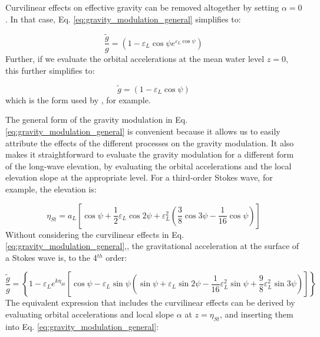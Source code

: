\documentclass[lineno]{jfm}
\begin{document}
Curvilinear effects on effective gravity can be removed altogether by setting
$\alpha = 0$.
In that case, Eq. \ref{eq:gravity_modulation_general} simplifies to:

\begin{equation}
\label{eq:gravity_modulation_linear_no_curvature}
\frac{\widetilde{g}}{g} = \left( 1 - \varepsilon_L \cos{\psi} e^{\varepsilon_L \cos{\psi}} \right)
\end{equation}
Further, if we evaluate the orbital accelerations at the mean water level $z=0$,
this further simplifies to:

\begin{equation}
\label{eq:gravity_modulation_linear_no_curvature_mean_level}
\widetilde{g} = \left( 1 - \varepsilon_L \cos{\psi} \right)
\end{equation}
which is the form used by \citet{peureux2021unsteady}, for example.

The general form of the gravity modulation in Eq. \ref{eq:gravity_modulation_general}
is convenient because it allows us to easily attribute the effects of the different
processes on the gravity modulation.
It also makes it straightforward to evaluate the gravity modulation for a different
form of the long-wave elevation, by evaluating the orbital accelerations and the
local elevation slope at the appropriate level.
For a third-order Stokes wave, for example, the elevation is:

\begin{equation}
\label{eq:eta_stokes}
\eta_{St} = a_L \left[
  \cos{\psi} +
  \dfrac{1}{2} \varepsilon_L \cos{2\psi} +
  \varepsilon_L^2 \left( \dfrac{3}{8} \cos{3\psi} - \dfrac{1}{16} \cos{\psi} \right)
\right]
\end{equation}
Without considering the curvilinear effects in Eq. \ref{eq:gravity_modulation_general},,
the gravitational acceleration at the surface of a Stokes wave is, to the
4$^{th}$ order:

\begin{equation}
\label{eq:gravity_modulation_stokes}
\frac{\widetilde{g}}{g} =
\left\{
  1 - \varepsilon_L e^{k \eta_{St}}
  \left[ \cos{\psi} -
    \varepsilon_L \sin{\psi} \left(
      \sin{\psi}
      + \varepsilon_L \sin{2\psi}
      - \dfrac{1}{16} \varepsilon_L^2 \sin{\psi}
      + \dfrac{9}{8} \varepsilon_L^2 \sin{3\psi}
    \right)
  \right]
\right\}
\end{equation}
The equivalent expression that includes the curvilinear effects can be derived
by evaluating orbital accelerations and local slope $\alpha$ at $z = \eta_{St}$,
and inserting them into Eq. \ref{eq:gravity_modulation_general}:
\end{document}
